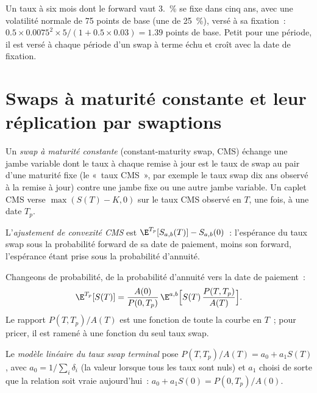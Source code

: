 \begin{example}\label{ex:rc:convexity-adjustments-and-constant-maturity-products:timing}
Un taux à six mois dont le forward vaut 3.~\% se fixe dans cinq ans, avec une
volatilité normale de 75 points de base (une  de 25~\%), versé à
sa fixation~: $0.5\times0.0075^2\times5/(1+0.5\times0.03) = 1.39$ points de base. Petit
pour une période, il est versé à chaque période d'un swap à terme échu et croît
avec la date de fixation.
\end{example}

\section{Swaps à maturité constante et leur réplication par swaptions}

\begin{definition}\label{def:rc:convexity-adjustments-and-constant-maturity-products:cms}
Un \emph{swap à maturité constante} (constant-maturity swap, CMS) échange
une jambe variable dont le taux à chaque remise à jour est le taux de swap au pair
d'une maturité fixe (le «~taux CMS~», par exemple le taux swap dix ans observé à la remise à jour)
contre une jambe fixe ou une autre jambe variable. Un caplet CMS verse
$\max(S(T)-K,0)$ sur le taux CMS observé en $T$, une fois, à une date $T_p$.
\end{definition}

\begin{definition}\label{def:rc:convexity-adjustments-and-constant-maturity-products:cmsadj}
L'\emph{ajustement de convexité CMS} est
$\E^{T_p}[S_{a,b}(T)]-S_{a,b}(0)$~: l'espérance du taux swap sous la
probabilité forward de sa date de paiement, moins son forward, l'espérance étant
prise sous la probabilité d'annuité.
\end{definition}

Changeons de probabilité, de la probabilité d'annuité vers la date de paiement~:
\[
\E^{T_p}[S(T)] = \frac{A(0)}{P(0,T_p)}\,\E^{a,b}\Bigl[S(T)\,\frac{P(T,T_p)}{A(T)}\Bigr].
\]
Le rapport $P(T,T_p)/A(T)$ est une fonction de toute la courbe en $T$~; pour pricer, il
est ramené à une fonction du seul taux swap.

\begin{definition}\label{def:rc:convexity-adjustments-and-constant-maturity-products:tsr}
Le \emph{modèle linéaire du taux swap terminal}
pose $P(T,T_p)/A(T) = a_0 + a_1S(T)$, avec $a_0 = 1/\sum_i\delta_i$ (la valeur lorsque
tous les taux sont nuls) et $a_1$ choisi de sorte que la relation soit vraie aujourd'hui~:
$a_0+a_1S(0) = P(0,T_p)/A(0)$.
\end{definition}

